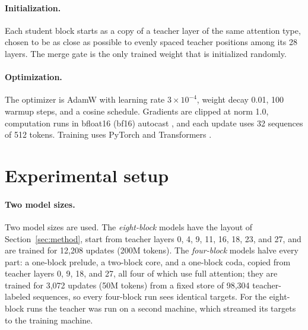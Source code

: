 \documentclass[11pt]{article}
\begin{document}
\paragraph{Initialization.}
Each student block starts as a copy of a teacher layer of the same attention type, chosen to be as close as possible to evenly spaced teacher
positions among its 28 layers. The merge gate is the only trained weight that is initialized randomly.

\paragraph{Optimization.}
The optimizer is AdamW \citep{loshchilov2019adamw} with learning rate $3\times10^{-4}$, weight decay 0.01, 100 warmup steps, and a cosine
schedule. Gradients are clipped at norm 1.0, computation runs in bfloat16 (bf16) autocast \citep{kalamkar2019bf16}, and each update uses 32
sequences of 512 tokens. Training uses PyTorch \citep{paszke2019pytorch} and Transformers \citep{wolf2020transformers}.

\section{Experimental setup}
\label{sec:setup}

\paragraph{Two model sizes.}
Two model sizes are used. The \emph{eight-block} models have the layout of Section~\ref{sec:method}, start from teacher layers 0, 4, 9, 11, 16, 18,
23, and 27, and are trained for 12,208 updates (200M tokens). The \emph{four-block} models halve every part: a one-block prelude, a two-block core, and a one-block coda, copied from teacher layers 0,
9, 18, and 27, all four of which use full attention; they are trained for 3,072 updates (50M tokens) from a fixed store of 98,304 teacher-labeled sequences, so every four-block run sees
identical targets. For the eight-block runs the teacher was run on a second machine, which streamed its targets to the training machine.
\end{document}
